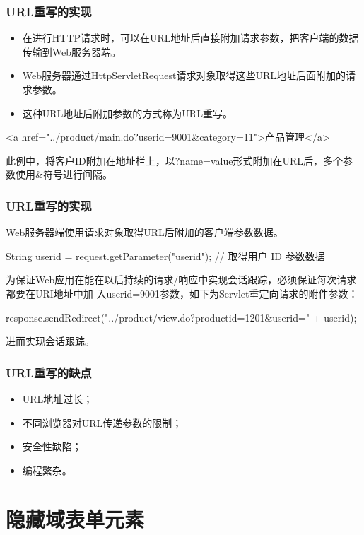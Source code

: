 \begin{frame}[fragile] %
\frametitle{URL重写的实现} 
\begin{itemize}
\item 在进行HTTP请求时，可以在URL地址后直接附加请求参数，把客户端的数据传输到Web服务器端。
\item Web服务器通过HttpServletRequest请求对象取得这些URL地址后面附加的请求参数。
\item 这种URL地址后附加参数的方式称为{\hei URL重写}。
\end{itemize}


\begin{xmlCode}
<a href="../product/main.do?userid=9001&category=11">产品管理</a>
\end{xmlCode}

此例中，将客户ID附加在地址栏上，以?name=value形式附加在URL后，多个参数使用\&符号进行间隔。
\end{frame}

\begin{frame}[fragile] %
\frametitle{URL重写的实现} 

Web服务器端使用请求对象取得URL后附加的客户端参数数据。
\begin{javaCode}
String userid = request.getParameter("userid"); // 取得用户 ID 参数数据
\end{javaCode}

为保证Web应用在能在以后持续的请求/响应中实现会话跟踪，必须保证每次请求都要在URI地址中加
入userid=9001参数，如下为Servlet重定向请求的附件参数：
\begin{javaCode}
response.sendRedirect("../product/view.do?productid=1201&userid=" + userid);
\end{javaCode}
进而实现会话跟踪。
\end{frame}

\begin{frame}[fragile] %
\frametitle{URL重写的缺点} 

\begin{itemize}
\item URL地址过长；
\item 不同浏览器对URL传递参数的限制；
\item 安全性缺陷；
\item 编程繁杂。
\end{itemize}
\end{frame}

\section{隐藏域表单元素}

